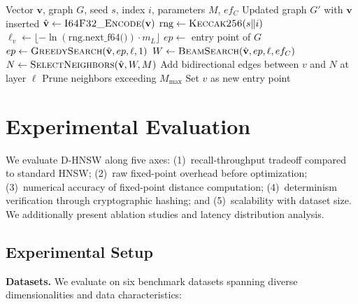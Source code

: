 \documentclass[10pt,journal,compsoc]{IEEEtran}
\newcommand{\dhnsw}{\textsc{D-HNSW}}
\newcommand{\hnsw}{\textsc{HNSW}}
\begin{document}
\begin{algorithm}[t]
  \caption{\dhnsw{} Deterministic Insert}
  \label{alg:dhnsw_insert}
  \begin{algorithmic}[1]
    \REQUIRE Vector $\mathbf{v}$, graph $G$, seed $s$, index $i$, parameters $M$, $ef_C$
    \ENSURE Updated graph $G'$ with $\mathbf{v}$ inserted
    \STATE $\hat{\mathbf{v}} \leftarrow \textsc{I64F32\_Encode}(\mathbf{v})$
    \STATE $\text{rng} \leftarrow \textsc{Keccak256}(s \| i)$
    \STATE $\ell_v \leftarrow \lfloor -\ln(\text{rng.next\_f64()}) \cdot m_L \rfloor$
    \STATE $ep \leftarrow$ entry point of $G$
      \STATE $ep \leftarrow \textsc{GreedySearch}(\hat{\mathbf{v}}, ep, \ell, 1)$
    \ENDFOR
      \STATE $W \leftarrow \textsc{BeamSearch}(\hat{\mathbf{v}}, ep, \ell, ef_C)$
      \STATE $N \leftarrow \textsc{SelectNeighbors}(\hat{\mathbf{v}}, W, M)$
      \STATE Add bidirectional edges between $v$ and $N$ at layer $\ell$
      \STATE Prune neighbors exceeding $M_{\max}$
    \ENDFOR
      \STATE Set $v$ as new entry point
    \ENDIF
  \end{algorithmic}
\end{algorithm}


\section{Experimental Evaluation}
\label{sec:experiments}

We evaluate \dhnsw{} along five axes: (1)~recall-throughput tradeoff compared to standard \hnsw{}; (2)~raw fixed-point overhead before optimization; (3)~numerical accuracy of fixed-point distance computation; (4)~determinism verification through cryptographic hashing; and (5)~scalability with dataset size. We additionally present ablation studies and latency distribution analysis.

\subsection{Experimental Setup}

\textbf{Datasets.} We evaluate on six benchmark datasets spanning diverse dimensionalities and data characteristics:
\end{document}
